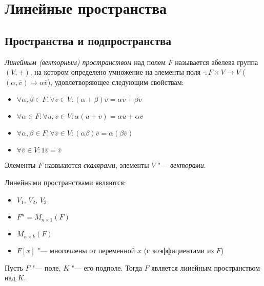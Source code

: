 \section{Линейные пространства}

\subsection{Пространства и подпространства}

\begin{definition}
	\textit{Линейным (векторным) пространством} над полем $F$ называется абелева группа $(V, +)$, на котором определено умножение на элементы поля $\cdot: F \times V \rightarrow V$ ($(\alpha, \overline{v}) \mapsto \alpha\overline{v}$), удовлетворяющее следующим свойствам:
	\begin{itemize}
		\item $\forall \alpha, \beta \in F: \forall \overline{v} \in V: (\alpha + \beta)\overline{v} = \alpha\overline{v} + \beta\overline{v}$
		\item $\forall \alpha \in F: \forall \overline{u}, \overline{v} \in V: \alpha(\overline{u} + \overline{v}) = \alpha\overline{u} + \alpha\overline{v}$
		\item $\forall \alpha, \beta \in F: \forall \overline{v} \in V: (\alpha\beta)\overline{v} = \alpha(\beta\overline{v})$
		\item $\forall \overline{v} \in V: 1\overline{v} = \overline{v}$
	\end{itemize}

Элементы $F$ назвыаются \textit{скалярами}, элементы $V$ "--- \textit{векторами}.
\end{definition}

\begin{example}
	Линейными пространствами являются:
	\begin{itemize}
		\item $V_1$, $V_2$, $V_3$
		\item $F^n = M_{n \times 1}(F)$
		\item $M_{n \times k}(F)$
		\item $F[x]$ "--- многочлены от переменной $x$ (с коэффициентами из $F$)
	\end{itemize}
\end{example}

\begin{example}
	Пусть $F$ "--- поле, $K$ "--- его подполе. Тогда $F$ является линейным пространством над $K$.
\end{example}

